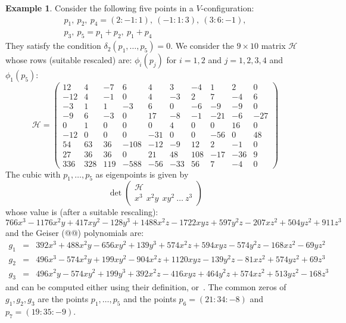\documentclass[11pt, a4paper, reqno, captions=tableheading,bibliography=totoc]{scrartcl}
\theoremstyle{plain}
\theoremstyle{definition}
\newtheorem{es}[lemma]{Example}
\begin{document}
\begin{es} Consider the following five points in a $V$-configuration:
\begin{gather*}
p_1, \ p_2, \ p_4 = (2: -1: 1), \ (-1: 1: 3), \ (3: 6: -1), \\
p_3, \ p_5 = p_1+p_2,  \ p_1+p_4
\end{gather*}
They satisfy the condition $\delta_2(p_1, \dots, p_5) = 0$.
We consider the $9\times 10$ matrix $\mathcal{H}$ whose rows
(suitable rescaled) are:
$\phi_i(p_j)$ for $i = 1, 2$ and $j = 1, 2, 3, 4$ and $\phi_1(p_5)$:
\[
\mathcal{H} =
\left(\begin{array}{rrrrrrrrrr}
12 & 4 & -7 & 6 & 4 & 3 & -4 & 1 & 2 & 0 \\
-12 & 4 & -1 & 0 & 4 & -3 & 2 & 7 & -4 & 6 \\
-3 & 1 & 1 & -3 & 6 & 0 & -6 & -9 & -9 & 0 \\
-9 & 6 & -3 & 0 & 17 & -8 & -1 & -21 & -6 & -27 \\
0 & 1 & 0 & 0 & 0 & 4 & 0 & 0 & 16 & 0 \\
-12 & 0 & 0 & 0 & -31 & 0 & 0 & -56 & 0 & 48 \\
54& 63& 36& -108& -12& -9& 12& 2& -1& 0\\
27 & 36 & 36 & 0 & 21 & 48 & 108 & -17 & -36 & 9 \\
336& 328& 119& -588& -56& -33& 56& 7& -4& 0
\end{array}
\right)
\]
The cubic with $p_1, \dots, p_5$ as eigenpoints is given by
\[
\det \left(
\begin{array}{c}
\mathcal{H}\\
x^3 \ \ x^2y \ \ xy^2 \ \dots \  z^3
\end{array}
\right)
\]
whose value is (after a suitable rescaling):
\[
766x^3 - 1176x^2y + 417xy^2 - 128y^3 + 1488x^2z - 1722xyz
+ 597y^2z - 207xz^2 + 504yz^2 + 911z^3
\]
and the Geiser (@@) polynomials are:
\begin{eqnarray*}
g_1 & = & 392x^3 + 488x^2y - 656xy^2 + 139y^3 + 574x^2z + 594xyz - 574y^2z - 168xz^2 - 69yz^2\\
g_2 & = & 496x^3 - 574x^2y + 199xy^2 - 904x^2z + 1120xyz - 139y^2z - 81xz^2 + 574yz^2 + 69z^3\\
g_3 & = & 496x^2y - 574xy^2 + 199y^3 + 392x^2z - 416xyz + 464y^2z + 574xz^2 + 513yz^2 - 168z^3
\end{eqnarray*}
and can be computed either using their definition,
or~.
The common zeros of $g_1, g_2, g_3$ are the points $p_1, \dots, p_5$
and the points $p_6 = (21: 34: -8)$ and $p_7 = (19: 35: -9)$.
\end{es}
\end{document}
